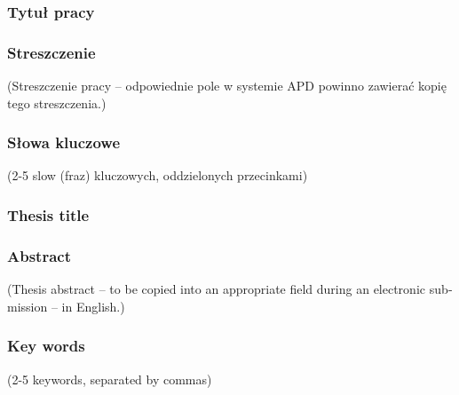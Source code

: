 \documentclass[a4paper,twoside,12pt]{book}
\begin{document}


\cleardoublepage

\rmfamily\normalfont
\pagestyle{empty}



\subsubsection*{Tytuł pracy} 
\Title

\subsubsection*{Streszczenie}  
(Streszczenie pracy – odpowiednie pole w systemie APD powinno zawierać kopię tego streszczenia.)

\subsubsection*{Słowa kluczowe} 
(2-5 slow (fraz) kluczowych, oddzielonych przecinkami)

\subsubsection*{Thesis title} 
\begin{otherlanguage}{british}
\TitleAlt
\end{otherlanguage}

\subsubsection*{Abstract} 
\begin{otherlanguage}{british}
(Thesis abstract – to be copied into an appropriate field during an electronic submission – in English.)
\end{otherlanguage}
\subsubsection*{Key words}  
\begin{otherlanguage}{british}
(2-5 keywords, separated by commas)
\end{otherlanguage}
\end{document}
